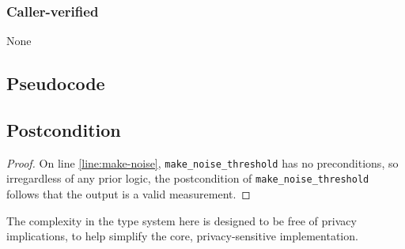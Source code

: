 \documentclass{article}
\begin{document}
\subsubsection*{Caller-verified}
None

\subsection*{Pseudocode}


\subsection*{Postcondition}
\begin{theorem}
\end{theorem}

\begin{proof}
    On line \ref{line:make-noise}, \texttt{make\_noise\_threshold} has no preconditions,
    so irregardless of any prior logic,
    the postcondition of \texttt{make\_noise\_threshold} follows that the output is a valid measurement.
\end{proof}

The complexity in the type system here is designed to be free of privacy implications,
to help simplify the core, privacy-sensitive implementation.
\end{document}
